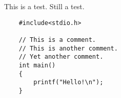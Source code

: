\documentclass{article}
\begin{document}
This is a test. Still a test.
\begin{lstlisting}
    #include<stdio.h>

    // This is a comment.
    // This is another comment.
    // Yet another comment.
    int main()
    {
        printf("Hello!\n");
    }
\end{lstlisting}
\end{document}
